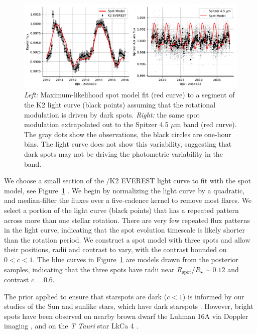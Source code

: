 \begin{figure}
\begin{center}
\includegraphics[scale=0.7]{trappist1_bright/best_dark_spot_model.pdf}
\end{center}
\caption{\textsl{Left:} Maximum-likelihood spot model fit (red curve) to a segment of the K2 light curve (black points) assuming that the rotational modulation is driven by dark spots. \textsl{Right:} the same spot modulation extrapolated out to the Spitzer 4.5 $\mu$m band (red curve). The gray dots show the \spitzer observations, the black circles are one-hour bins. The \spitzer light curve does not show this variability, suggesting that dark spots may not be driving the photometric variability in the \kepler band. \label{fig:dark_spots}}
\end{figure}

We choose a small section of the \kepler/K2 EVEREST light curve to fit with the spot model, see Figure~\ref{fig:dark_spots} \citep{luger2017everest}. We begin by normalizing the light curve by a quadratic, and median-filter the fluxes over a five-cadence kernel to remove most flares. We select a portion of the light curve (black points) that has a repeated pattern across more than one stellar rotation. There are very few repeated flux patterns in the \kepler light curve, indicating that the spot evolution timescale is likely shorter than the rotation period. We construct a spot model with three spots and allow their positions, radii and contrast to vary, with the contrast bounded on $0 < c < 1$. The blue curves in Figure~\ref{fig:dark_spots} are models drawn from the posterior samples, indicating that the three spots have radii near $R_\mathrm{spot}/R_\star \sim 0.12$ and contrast $c = 0.6$. 

The prior applied to ensure that starspots are dark ($c<1$) is informed by our studies of the Sun and sunlike stars, which have dark starspots \citep[see e.g.][]{Solanki2003, Morris2017a}.  However, bright spots have been observed on nearby brown dwarf the Luhman 16A via Doppler imaging \citep{Crossfield2014}, and on the \textit{T Tauri} star LkCa 4 \citep{Gully2017}.

